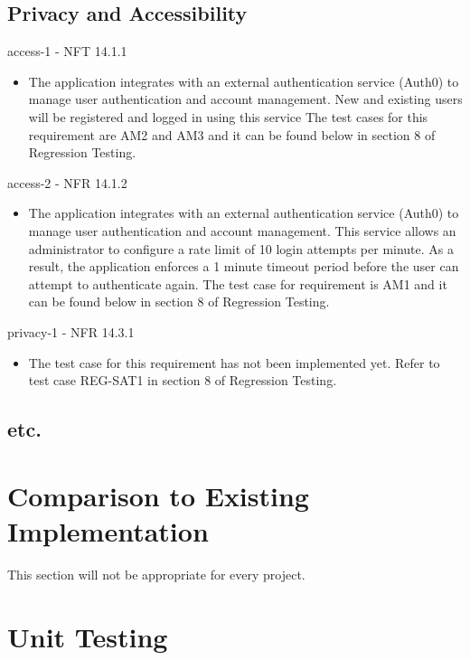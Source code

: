 \documentclass[12pt, titlepage]{article}
\begin{document}
\subsection{Privacy and Accessibility}

access-1 - NFT 14.1.1
\begin{itemize}
    \item The application integrates with an external authentication service (Auth0) to manage user authentication and account management. New and existing users will be registered and logged in using this service The test cases for this requirement are AM2 and AM3 and it can be found below in section 8 of Regression Testing.
\end{itemize}

access-2 - NFR 14.1.2
\begin{itemize}
\item The application integrates with an external authentication service (Auth0) to manage user authentication and account management. This service allows an administrator to configure a rate limit of 10 login attempts per minute. As a result, the application enforces a 1 minute timeout period before the user can attempt to authenticate again. The test case for requirement is AM1 and it can be found below in section 8 of Regression Testing.

\end{itemize}

privacy-1 - NFR 14.3.1
\begin{itemize}
\item The test case for this requirement has not been implemented yet. Refer to test case REG-SAT1 in section 8 of Regression Testing.

\end{itemize}


\subsection{etc.}
	
\section{Comparison to Existing Implementation}	

This section will not be appropriate for every project.

\section{Unit Testing}
\end{document}

